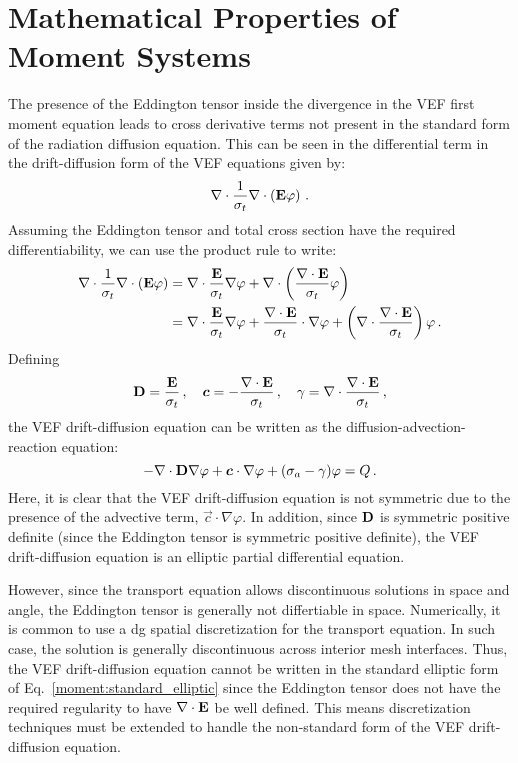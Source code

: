 \documentclass[../doc.tex]{subfiles}
\begin{document}
\section{Mathematical Properties of Moment Systems}
The presence of the Eddington tensor inside the divergence in the VEF first moment equation leads to cross derivative terms not present in the standard form of the radiation diffusion equation. This can be seen in the differential term in the drift-diffusion form of the VEF equations given by:
	\begin{equation}
		\nabla\cdot\frac{1}{\sigma_t}\nabla\cdot\left( \boldsymbol{\mathrm{E}}\varphi \right) \,. 
	\end{equation}
Assuming the Eddington tensor and total cross section have the required differentiability, we can use the product rule to write:
	\begin{equation}
	\begin{aligned}
		\nabla\cdot\frac{1}{\sigma_t}\nabla\cdot\left( \boldsymbol{\mathrm{E}}\varphi \right) &= \nabla\cdot\frac{\boldsymbol{\mathrm{E}}}{\sigma_t}\nabla\varphi + \nabla\cdot\left( \frac{\nabla\cdot\boldsymbol{\mathrm{E}}}{\sigma_t}\varphi \right) \\
		&= \nabla\cdot\frac{\boldsymbol{\mathrm{E}}}{\sigma_t}\nabla\varphi + \frac{\nabla\cdot\boldsymbol{\mathrm{E}}}{\sigma_t}\cdot\nabla\varphi + \left( \nabla\cdot\frac{\nabla\cdot\boldsymbol{\mathrm{E}}}{\sigma_t} \right) \varphi \,. 
	\end{aligned}
	\end{equation}
Defining 
	\begin{equation}
		\boldsymbol{\mathrm{D}} = \frac{\boldsymbol{\mathrm{E}}}{\sigma_t}\,,\quad \boldsymbol{c} = -\frac{\nabla\cdot\boldsymbol{\mathrm{E}}}{\sigma_t}\,, \quad \gamma = \nabla\cdot\frac{\nabla\cdot\boldsymbol{\mathrm{E}}}{\sigma_t} \,,
	\end{equation}
the VEF drift-diffusion equation can be written as the diffusion-advection-reaction equation: 
	\begin{equation} \label{moment:standard_elliptic}
		-\nabla\cdot\boldsymbol{\mathrm{D}}\nabla\varphi + \boldsymbol{c}\cdot\nabla\varphi + (\sigma_a - \gamma) \varphi = Q \,. 
	\end{equation}
Here, it is clear that the VEF drift-diffusion equation is not symmetric due to the presence of the advective term, $\vec{c}\cdot\nabla\varphi$. In addition, since $\boldsymbol{\mathrm{D}}$ is symmetric positive definite (since the Eddington tensor is symmetric positive definite), the VEF drift-diffusion equation is an elliptic partial differential equation. 

However, since the transport equation allows discontinuous solutions in space and angle, the Eddington tensor is generally not differtiable in space. Numerically, it is common to use a \gls{dg} spatial discretization for the transport equation. In such case, the solution is generally discontinuous across interior mesh interfaces. Thus, the VEF drift-diffusion equation cannot be written in the standard elliptic form of Eq.~\ref{moment:standard_elliptic} since the Eddington tensor does not have the required regularity to have $\nabla\cdot\boldsymbol{\mathrm{E}}$ be well defined. This means discretization techniques must be extended to handle the non-standard form of the VEF drift-diffusion equation. 
\end{document}
